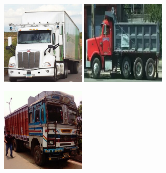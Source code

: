 \begin{enumerate}
        \begin{figure}[H]
        \captionsetup{justification=centering, margin=0.2cm}
        \centering
            \begin{subfigure}[b]{0.45\textwidth}
                \includegraphics[width=0.45\textwidth]{images/dataset_images/bdd_samples/tusimple_0.jpg}
                \includegraphics[width=0.45\textwidth]{images/dataset_images/bdd_samples/truck.png}
                \caption{}
                \label{Truck01_BDD}
            \end{subfigure}
            \begin{subfigure}[b]{0.45\textwidth}
               \includegraphics[width=0.45\textwidth]{images/dataset_images/bdd_samples/Truck_idd.jpg}

\end{subfigure}
\end{figure}
\end{enumerate}
